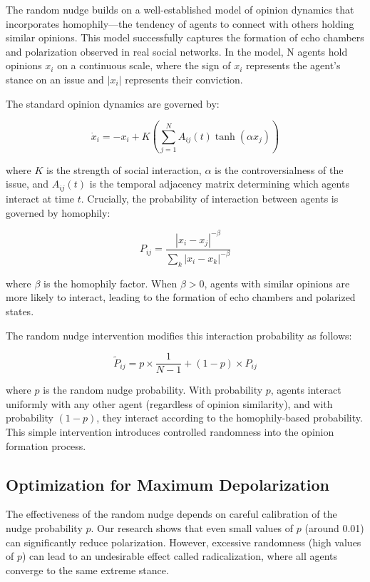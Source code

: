 The random nudge builds on a well-established model of opinion dynamics that incorporates homophily—the tendency of agents to connect with others holding similar opinions. This model successfully captures the formation of echo chambers and polarization observed in real social networks. In the model, N agents hold opinions $x_i$ on a continuous scale, where the sign of $x_i$ represents the agent's stance on an issue and $|x_i|$ represents their conviction.

The standard opinion dynamics are governed by:

\begin{equation}
    \dot{x}_i= -x_i + K \left(\sum^{N}_{j=1} A_{ij} (t)  \tanh{(\alpha x_j)}\right)
\end{equation}

where $K$ is the strength of social interaction, $\alpha$ is the controversialness of the issue, and $A_{ij}(t)$ is the temporal adjacency matrix determining which agents interact at time $t$. Crucially, the probability of interaction between agents is governed by homophily:

\begin{equation}
    P_{ij} = \frac{|x_i - x_j|^{-\beta}}{\sum_k{|x_i - x_k|^{-\beta}}}
\end{equation}

where $\beta$ is the homophily factor. When $\beta > 0$, agents with similar opinions are more likely to interact, leading to the formation of echo chambers and polarized states.

The random nudge intervention modifies this interaction probability as follows:

\begin{equation}
    \widetilde{P}_{ij} = p \times \frac{1}{N - 1} + (1 - p) \times P_{ij}
\end{equation}

where $p$ is the random nudge probability. With probability $p$, agents interact uniformly with any other agent (regardless of opinion similarity), and with probability $(1-p)$, they interact according to the homophily-based probability. This simple intervention introduces controlled randomness into the opinion formation process.

\subsection{Optimization for Maximum Depolarization}

The effectiveness of the random nudge depends on careful calibration of the nudge probability $p$. Our research shows that even small values of $p$ (around 0.01) can significantly reduce polarization. However, excessive randomness (high values of $p$) can lead to an undesirable effect called radicalization, where all agents converge to the same extreme stance.

